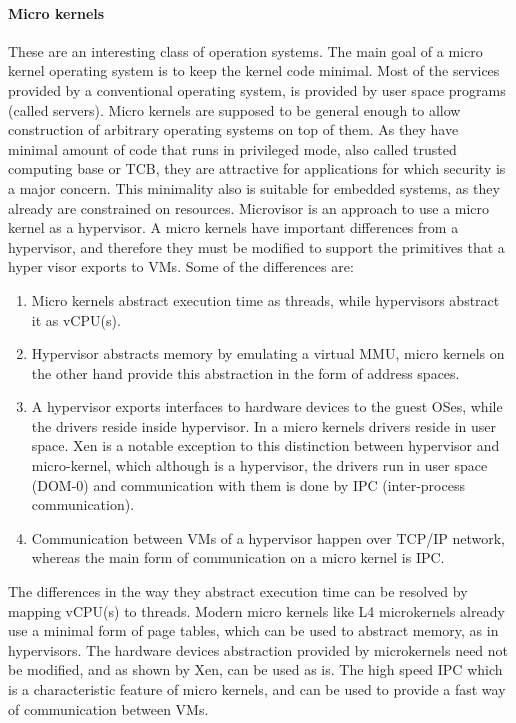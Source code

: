 \documentclass[seminar,twoside]{iitbreport}
\begin{document}
  \paragraph{Micro kernels}
  These are an interesting class of operation systems. The main goal of a micro kernel operating system is to keep the kernel code minimal. Most of the services provided by
  a conventional operating system, is provided by user space programs (called servers). Micro kernels are supposed to be general enough to allow construction of
  arbitrary operating systems on top of them. As they have minimal amount of code that runs in privileged mode, also called trusted computing base or TCB, they are
  attractive for applications for which security is a major concern. This minimality also is suitable for embedded systems, as they already are constrained on
  resources. Microvisor\cite{Heiser:2010:OMC:1851276.1851282} is an approach to use a micro kernel as a hypervisor. A micro kernels have important differences from
  a hypervisor, and therefore they must be modified to support the primitives that a hyper visor exports to VMs.
  Some of the differences are:
  \begin{enumerate}
  \item Micro kernels abstract execution time as threads, while hypervisors abstract it as vCPU(s).
  \item Hypervisor abstracts memory by emulating a virtual MMU, micro kernels on the other hand provide this abstraction in the form of address spaces.
  \item A hypervisor exports interfaces to hardware devices to the guest OSes, while the drivers reside inside hypervisor. In a micro kernels drivers reside in user space. Xen
  is a notable exception to this distinction between hypervisor and micro-kernel, which although is a hypervisor, the drivers run in user space (DOM-0) and communication with them
  is done by IPC (inter-process communication).
  \item Communication between VMs of a hypervisor happen over TCP/IP network, whereas the main form of communication on a micro kernel is IPC.
  \end{enumerate}
  
  The differences in the way they abstract execution time can be resolved by mapping vCPU(s) to threads. Modern micro kernels like L4 microkernels already use a minimal
  form of page tables, which can be used to abstract memory, as in hypervisors. The hardware devices abstraction provided by microkernels need not be modified, and as shown
  by Xen, can be used as is. The high speed IPC which is a characteristic feature of micro kernels, and can be used to provide a fast way of communication between VMs.
  
\end{document}
